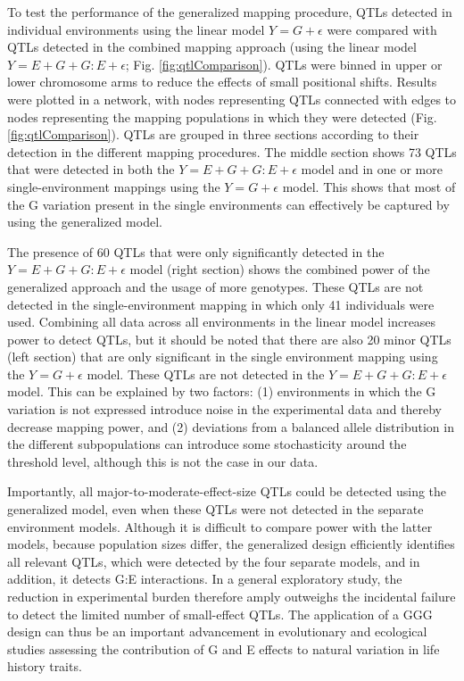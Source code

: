 To test the performance of the generalized mapping procedure, QTLs detected in individual environments
using the linear model $Y = G + \epsilon$ were compared with QTLs detected in the combined mapping 
approach (using the linear model $Y = E + G + G:E + \epsilon$; Fig. \ref{fig:qtlComparison}).
QTLs were binned in upper or lower chromosome arms to reduce the effects of small positional shifts.
Results were plotted in a network, with nodes representing QTLs connected with edges to nodes representing 
the mapping populations in which they were detected (Fig. \ref{fig:qtlComparison}). QTLs are grouped in three sections
according to their detection in the different mapping procedures. The middle section shows 73 QTLs that
were detected in both the $Y = E + G + G:E + \epsilon$ model and in one or more single-environment mappings 
using the $Y = G + \epsilon$ model. This shows that most of the G variation present in the single environments 
can effectively be captured by using the generalized model.

The presence of 60 QTLs that were only significantly detected in the $Y = E + G + G:E + \epsilon$ model 
(right section) shows the combined power of the generalized approach and the usage of more genotypes. 
These QTLs are not detected in the single-environment mapping in which only 41 individuals were used.
Combining all data across all environments in the linear model increases power to detect QTLs, but it
should be noted that there are also 20 minor QTLs (left section) that are only significant in the single
environment mapping using the $Y = G + \epsilon$ model. These QTLs are not detected in the $ Y = E + G + G:E + \epsilon$
model. This can be explained by two factors: (1) environments in which the G variation is not expressed
introduce noise in the experimental data and thereby decrease mapping power, and (2) deviations from a
balanced allele distribution in the different subpopulations can introduce some stochasticity around the
threshold level, although this is not the case in our data.

Importantly, all major-to-moderate-effect-size QTLs could be detected using the generalized model, even
when these QTLs were not detected in the separate environment models. Although it is difficult to 
compare power with the latter models, because population sizes differ, the generalized design 
efficiently identifies all relevant QTLs, which were detected by the four separate models, and in addition, 
it detects G:E interactions. In a general exploratory study, the reduction in experimental burden therefore 
amply outweighs the incidental failure to detect the limited number of small-effect QTLs. The application 
of a GGG design can thus be an important advancement in evolutionary and ecological studies assessing 
the contribution of G and E effects to natural variation in life history traits.

